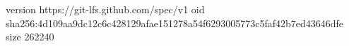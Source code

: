 version https://git-lfs.github.com/spec/v1
oid sha256:4d109aa9dc12c6c428129afae151278a54f6293005773c5faf42b7ed43646dfe
size 262240
